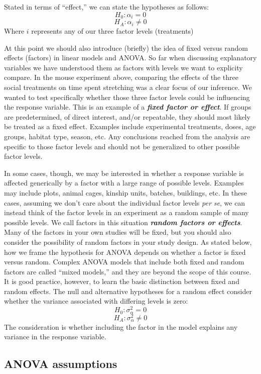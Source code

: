 \documentclass[
]{book}
\begin{document}
Stated in terms of ``effect,'' we can state the hypotheses as follows:
\[H_0:\alpha_i=0\]
\[H_A:\alpha_i\neq0\]
Where \(i\) represents any of our three factor levels (treatments)

At this point we should also introduce (briefly) the idea of fixed versus random effects (factors) in linear models and ANOVA. So far when discussing explanatory variables we have understood them as factors with levels we want to explicity compare. In the mouse experiment above, comparing the effects of the three social treatments on time spent stretching was a clear focus of our inference. We wanted to test specifically whether those three factor levels could be influencing the response variable. This is an example of a \textbf{\emph{fixed factor or effect}}. If groups are predetermined, of direct interest, and/or repeatable, they should most likely be treated as a fixed effect. Examples include experimental treatments, doses, age groups, habitat type, season, etc. Any conclusions reached from the analysis are specific to those factor levels and should not be generalized to other possible factor levels.

In some cases, though, we may be interested in whether a response variable is affected generically by a factor with a large range of possible levels. Examples may include plots, animal cages, kinship units, batches, buildings, etc. In these cases, assuming we don't care about the individual factor levels \emph{per se}, we can instead think of the factor levels in an experiment as a random sample of many possible levels. We call factors in this situation \textbf{\emph{random factors or effects}}. Many of the factors in your own studies will be fixed, but you should also consider the possibility of random factors in your study design. As stated below, how we frame the hypothesis for ANOVA depends on whether a factor is fixed versus random. Complex ANOVA models that include both fixed and random factors are called ``mixed models,'' and they are beyond the scope of this course. It is good practice, however, to learn the basic distinction between fixed and random effects. The null and alternative hypotheses for a random effect consider whether the variance associated with differing levels is zero:
\[H_0:\sigma_{\alpha}^2=0\]
\[H_A:\sigma_{\alpha}^2\neq0\]
The consideration is whether including the factor in the model explains any variance in the response variable.

\hypertarget{anova-assumptions}{%
\subsection{ANOVA assumptions}\label{anova-assumptions}}
\end{document}
